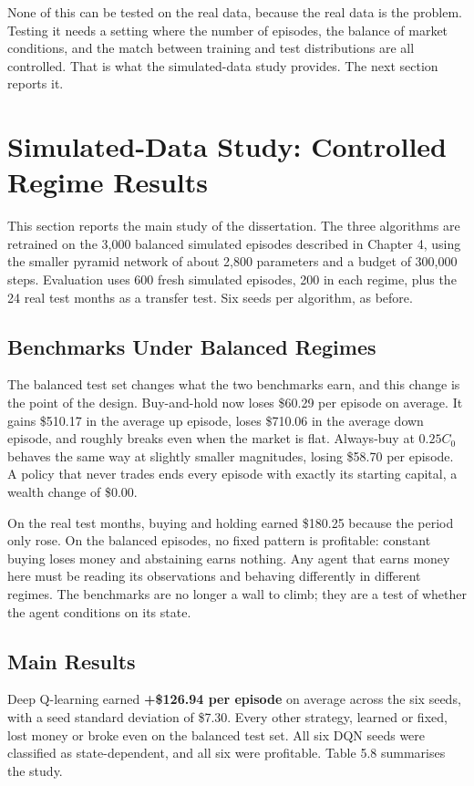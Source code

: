 None of this can be tested on the real data, because the real data is
the problem. Testing it needs a setting where the number of episodes,
the balance of market conditions, and the match between training and
test distributions are all controlled. That is what the simulated-data
study provides. The next section reports it.

\section{Simulated-Data Study: Controlled Regime Results}

This section reports the main study of the dissertation. The three
algorithms are retrained on the 3,000 balanced simulated episodes
described in Chapter 4, using the smaller pyramid network of about 2,800
parameters and a budget of 300,000 steps. Evaluation uses 600 fresh
simulated episodes, 200 in each regime, plus the 24 real test months as
a transfer test. Six seeds per algorithm, as before.

\subsection{Benchmarks Under Balanced Regimes}

The balanced test set changes what the two benchmarks earn, and this
change is the point of the design. Buy-and-hold now loses \$60.29 per
episode on average. It gains \$510.17 in the average up episode, loses
\$710.06 in the average down episode, and roughly breaks even when the
market is flat. Always-buy at \(0.25C_{0}\) behaves the same way at
slightly smaller magnitudes, losing \$58.70 per episode. A policy that
never trades ends every episode with exactly its starting capital, a
wealth change of \$0.00.

On the real test months, buying and holding earned \$180.25 because the
period only rose. On the balanced episodes, no fixed pattern is
profitable: constant buying loses money and abstaining earns nothing.
Any agent that earns money here must be reading its observations and
behaving differently in different regimes. The benchmarks are no longer
a wall to climb; they are a test of whether the agent conditions on its
state.

\subsection{Main Results}

Deep Q-learning earned \textbf{+\$126.94 per episode} on average across
the six seeds, with a seed standard deviation of \$7.30. Every other
strategy, learned or fixed, lost money or broke even on the balanced
test set. All six DQN seeds were classified as state-dependent, and all
six were profitable. Table 5.8 summarises the study.

